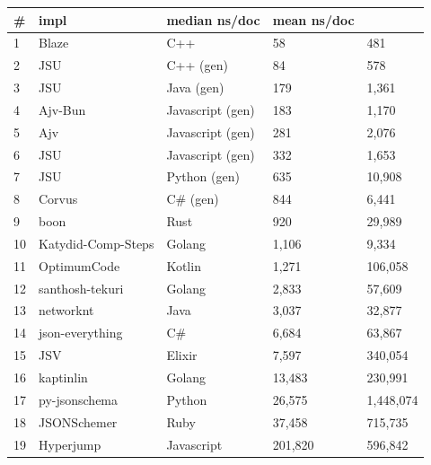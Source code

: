 \begin{tabular}{ll|l|ll}
\# & impl & median ns/doc & mean ns/doc \\
\hline
1 & Blaze & C++ & 58 & 481 \\
2 & JSU & C++ (gen) & 84 & 578 \\
3 & JSU & Java (gen) & 179 & 1,361 \\
4 & Ajv-Bun & Javascript (gen) & 183 & 1,170 \\
5 & Ajv & Javascript (gen) & 281 & 2,076 \\
6 & JSU & Javascript (gen) & 332 & 1,653 \\
7 & JSU & Python (gen) & 635 & 10,908 \\
8 & Corvus & C\# (gen) & 844 & 6,441 \\
9 & boon & Rust & 920 & 29,989 \\
10 & Katydid-Comp-Steps & Golang & 1,106 & 9,334 \\
11 & OptimumCode & Kotlin & 1,271 & 106,058 \\
12 & santhosh-tekuri & Golang & 2,833 & 57,609 \\
13 & networknt & Java & 3,037 & 32,877 \\
14 & json-everything & C\# & 6,684 & 63,867 \\
15 & JSV & Elixir & 7,597 & 340,054 \\
16 & kaptinlin & Golang & 13,483 & 230,991 \\
17 & py-jsonschema & Python & 26,575 & 1,448,074 \\
18 & JSONSchemer & Ruby & 37,458 & 715,735 \\
19 & Hyperjump & Javascript & 201,820 & 596,842 \\
\end{tabular}
